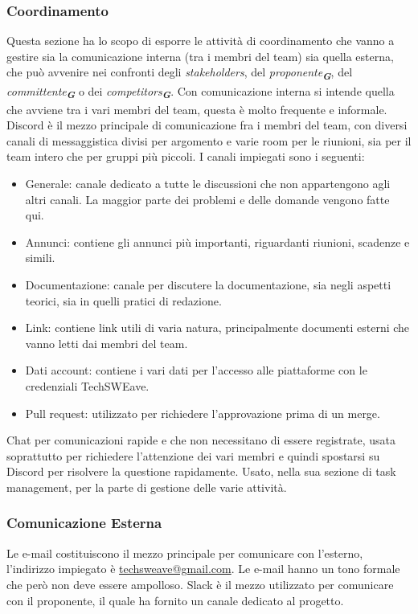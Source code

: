\subsubsection{Coordinamento}
Questa sezione ha lo scopo di esporre le attività di coordinamento che vanno a gestire sia la comunicazione interna (tra i membri del team) sia quella esterna, che può avvenire nei confronti degli \textit{stakeholders}, del \textit{proponente\textsubscript{\textbf{G}}}, del \textit{committente\textsubscript{\textbf{G}}} o dei \textit{competitors\textsubscript{\textbf{G}}}.
Con comunicazione interna si intende quella che avviene tra i vari membri del team, questa è molto frequente e informale.
Discord è il mezzo principale di comunicazione fra i membri del team, con diversi canali di messaggistica divisi per argomento e varie room per le riunioni, sia per il team intero che per gruppi più piccoli.
I canali impiegati sono i seguenti:
\begin{itemize}
    \item Generale: canale dedicato a tutte le discussioni che non appartengono agli altri canali. La maggior parte dei problemi e delle domande vengono fatte qui.
    \item Annunci: contiene gli annunci più importanti, riguardanti riunioni, scadenze e simili.
    \item Documentazione: canale per discutere la documentazione, sia negli aspetti teorici, sia in quelli pratici di redazione.
    \item Link: contiene link utili di varia natura, principalmente documenti esterni che vanno letti dai membri del team.
    \item Dati account: contiene i vari dati per l'accesso alle piattaforme con le credenziali TechSWEave.
    \item Pull request: utilizzato per richiedere l'approvazione prima di un merge.
\end{itemize}
Chat per comunicazioni rapide e che non necessitano di essere registrate, usata soprattutto per richiedere l'attenzione dei vari membri e quindi spostarsi su Discord per risolvere la questione rapidamente.
Usato, nella sua sezione di task management, per la parte di gestione delle varie attività.
\subsubsection{Comunicazione Esterna}
Le e-mail costituiscono il mezzo principale per comunicare con l'esterno, l'indirizzo impiegato è \href{mailto:techsweave@gmail.com}{techsweave@gmail.com}. Le e-mail hanno un tono formale che però non deve essere ampolloso.
Slack è il mezzo utilizzato per comunicare con il proponente, il quale ha fornito un canale dedicato al progetto.
